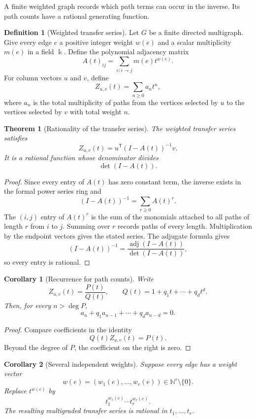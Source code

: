 \documentclass{aomart}
\newtheorem{theorem}{Theorem}[section]
\newtheorem{corollary}[corollary]{Corollary}
\theoremstyle{definition}
\newtheorem{definition}[definition]{Definition}
\theoremstyle{remark}
\newcommand{\bbk}{\Bbbk}
\begin{document}
A finite weighted graph records which path terms can occur in the inverse.  Its path counts have a rational generating function.

\begin{definition}[Weighted transfer series]\label{def:transfer_series}
Let $G$ be a finite directed multigraph.  Give every edge $e$ a positive integer weight $w(e)$ and a scalar multiplicity $m(e)$ in a field $\bbk$.  Define the polynomial adjacency matrix
\[
A(t)_{ij}
=
\sum_{e:i\to j}m(e)t^{w(e)}.
\]
For column vectors $u$ and $v$, define
\[
Z_{u,v}(t)
=
\sum_{n\geq0}a_nt^n,
\]
where $a_n$ is the total multiplicity of paths from the vertices selected by $u$ to the vertices selected by $v$ with total weight $n$.
\end{definition}

\begin{theorem}[Rationality of the transfer series]\label{thm:transfer_rationality}
The weighted transfer series satisfies
\[
Z_{u,v}(t)
=
u^{\mathsf T}(I-A(t))^{-1}v.
\]
It is a rational function whose denominator divides
\[
\det(I-A(t)).
\]
\end{theorem}

\begin{proof}
Since every entry of $A(t)$ has zero constant term, the inverse exists in the formal power series ring and
\[
(I-A(t))^{-1}=\sum_{r\geq0}A(t)^r.
\]
The $(i,j)$ entry of $A(t)^r$ is the sum of the monomials attached to all paths of length $r$ from $i$ to $j$.  Summing over $r$ records paths of every length.  Multiplication by the endpoint vectors gives the stated series.  The adjugate formula gives
\[
(I-A(t))^{-1}
=
\frac{\operatorname{adj}(I-A(t))}{\det(I-A(t))},
\]
so every entry is rational.
\end{proof}

\begin{corollary}[Recurrence for path counts]\label{cor:path_recurrence}
Write
\[
Z_{u,v}(t)=\frac{P(t)}{Q(t)},
\qquad
Q(t)=1+q_1t+\cdots+q_dt^d.
\]
Then, for every $n>\deg P$,
\[
a_n+q_1a_{n-1}+\cdots+q_da_{n-d}=0.
\]
\end{corollary}

\begin{proof}
Compare coefficients in the identity
\[
Q(t)Z_{u,v}(t)=P(t).
\]
Beyond the degree of $P$, the coefficient on the right is zero.
\end{proof}

\begin{corollary}[Several independent weights]\label{cor:multigraded_series}
Suppose every edge has a weight vector
\[
w(e)=(w_1(e),\ldots,w_r(e))\in\mathbb N^r\setminus\{0\}.
\]
Replace $t^{w(e)}$ by
\[
t_1^{w_1(e)}\cdots t_r^{w_r(e)}.
\]
The resulting multigraded transfer series is rational in $t_1,\ldots,t_r$.
\end{corollary}
\end{document}
